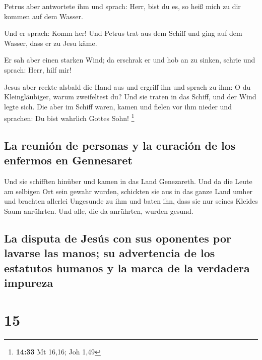  Petrus aber antwortete ihm und sprach: Herr, bist du es,
so heiß mich zu dir kommen auf dem Wasser.

 Und er sprach: Komm her! Und Petrus trat aus dem Schiff
und ging auf dem Wasser, dass er zu Jesu käme.

 Er sah aber einen starken Wind; da erschrak er und hob
an zu sinken, schrie und sprach: Herr, hilf mir!

 Jesus aber reckte alsbald die Hand aus und ergriff ihn
und sprach zu ihm: O du Kleingläubiger, warum zweifeltest du?
 Und sie traten in das Schiff, und der Wind legte sich.
 Die aber im Schiff waren, kamen und fielen vor ihm
nieder und sprachen: Du bist wahrlich Gottes Sohn! \footnote{\textbf{14:33}
  Mt 16,16; Joh 1,49}

\hypertarget{la-reuniuxf3n-de-personas-y-la-curaciuxf3n-de-los-enfermos-en-gennesaret}{%
\subsection{La reunión de personas y la curación de los enfermos en
Gennesaret}\label{la-reuniuxf3n-de-personas-y-la-curaciuxf3n-de-los-enfermos-en-gennesaret}}

 Und sie schifften hinüber und kamen in das Land
Genezareth.  Und da die Leute am selbigen Ort sein gewahr
wurden, schickten sie aus in das ganze Land umher und brachten allerlei
Ungesunde zu ihm  und baten ihn, dass sie nur seines
Kleides Saum anrührten. Und alle, die da anrührten, wurden gesund.

\hypertarget{la-disputa-de-jesuxfas-con-sus-oponentes-por-lavarse-las-manos-su-advertencia-de-los-estatutos-humanos-y-la-marca-de-la-verdadera-impureza}{%
\subsection{La disputa de Jesús con sus oponentes por lavarse las manos;
su advertencia de los estatutos humanos y la marca de la verdadera
impureza}\label{la-disputa-de-jesuxfas-con-sus-oponentes-por-lavarse-las-manos-su-advertencia-de-los-estatutos-humanos-y-la-marca-de-la-verdadera-impureza}}

\hypertarget{section-14}{%
\section{15}\label{section-14}}

